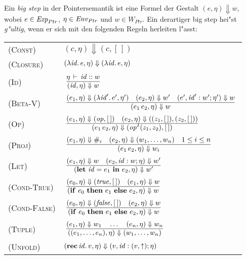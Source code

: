 \documentclass[12pt,fleqn,a4paper]{article}
\newcommand{\RN}[1]{\mbox{\textsc{(#1)}}}
\begin{document}
\begin{definition}
Ein {\em big step} in der Pointersemantik ist eine Formel der Gestalt $(e,\eta) \Downarrow w$,
wobei $e\in{\text{\it Exp\/}}_{Ptr}$, $\eta \in {\text{\it Env\/}}_{Ptr}$ und $w \in W_{Ptr}$. Ein derartiger big step hei"st
{\em g"ultig}, wenn er sich mit den folgenden Regeln herleiten l"asst: \\[5mm]
\begin{tabular}{ll}
  \RN{Const}      & $(c,\eta) \Downarrow (c,[\,])$ \\[1mm]
  \RN{Closure}    & $(\lambda {\text{\it id\/}}.\,e,\eta) \Downarrow (\lambda {\text{\it id\/}}.\,e,\eta)$ \\[1mm]
  \RN{Id}         & $\regel{\Lj{\eta}{\id}{w}}
                           {(\id,\eta) \Downarrow w}$ \\[3mm]
  \RN{Beta-V}     & $\regel{(e_1,\eta) \Downarrow (\abstr{\id'}{e'},\eta')
                            \quad (e_2,\eta) \Downarrow w'
                            \quad (e',\id':w';\eta') \Downarrow w}
                           {(\app{e_1}{e_2},\eta) \Downarrow w}$ \\[3mm]
  \RN{Op}         & $\regel{(e_1,\eta) \Downarrow (\op,[\,]) \quad (e_2,\eta) \Downarrow ((z_1,[\,]),(z_2,[\,]))}
                           {(\app{e_1}{e_2},\eta) \Downarrow (\op^I(z_1,z_2),[\,])}$ \\[3mm]
  \RN{Proj}       & $\regel{(e_1,\eta) \Downarrow \proj{i}
                            \quad (e_2,\eta) \Downarrow (w_1,\ldots,w_n)
                            \quad 1 \le i \le n}
                           {(\app{e_1}{e_2},\eta) \Downarrow w_i}$ \\[3mm]
  \RN{Let}        & $\regel{(e_1,\eta) \Downarrow w \quad (e_2,\id:w;\eta) \Downarrow w'}
                           {(\bli{\id}{e_1}{e_2},\eta) \Downarrow w'}$ \\[3mm]
  \RN{Cond-True}  & $\regel{(e_0,\eta) \Downarrow (\true,[\,]) \quad (e_1,\eta) \Downarrow w}
                           {(\bifte{e_0}{e_1}{e_2},\eta) \Downarrow w}$ \\[3mm]
  \RN{Cond-False} & $\regel{(e_0,\eta) \Downarrow (\false,[\,]) \quad (e_2,\eta) \Downarrow w}
                           {(\bifte{e_0}{e_1}{e_2},\eta) \Downarrow w}$ \\[3mm]
  \RN{Tuple}      & $\regel{(e_1,\eta) \Downarrow w_1 \quad \ldots \quad (e_n,\eta) \Downarrow w_n}
                           {((e_1,\ldots,e_n),\eta) \Downarrow (w_1,\ldots,w_n)}$ \\[3mm]
  \RN{Unfold}     & $(\mathbf{rec}\,{\text{\it id\/}}.\,v,\eta) \Downarrow (v,{\text{\it id\/}}:(v,\uparrow);\eta)$ \\[3mm]
\end{tabular}
\end{definition}
\end{document}
